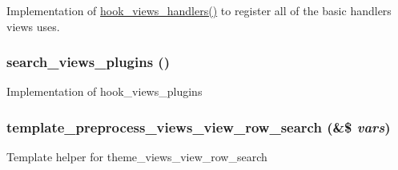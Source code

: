 Implementation of \hyperlink{group__views__hooks_gbf506f44bd8d8a86876f27396f5341ed}{hook\_\-views\_\-handlers()} to register all of the basic handlers views uses. \hypertarget{group__views__search__module_gef27a11e726ee0039e3ffeed38562df3}{
\subsubsection[{search\_\-views\_\-plugins}]{\setlength{\rightskip}{0pt plus 5cm}search\_\-views\_\-plugins ()}}
\label{group__views__search__module_gef27a11e726ee0039e3ffeed38562df3}


Implementation of hook\_\-views\_\-plugins \hypertarget{group__views__search__module_gd2005db0a4841d084cadac887649bf6f}{
\subsubsection[{template\_\-preprocess\_\-views\_\-view\_\-row\_\-search}]{\setlength{\rightskip}{0pt plus 5cm}template\_\-preprocess\_\-views\_\-view\_\-row\_\-search (\&\$ {\em vars})}}
\label{group__views__search__module_gd2005db0a4841d084cadac887649bf6f}


Template helper for theme\_\-views\_\-view\_\-row\_\-search 